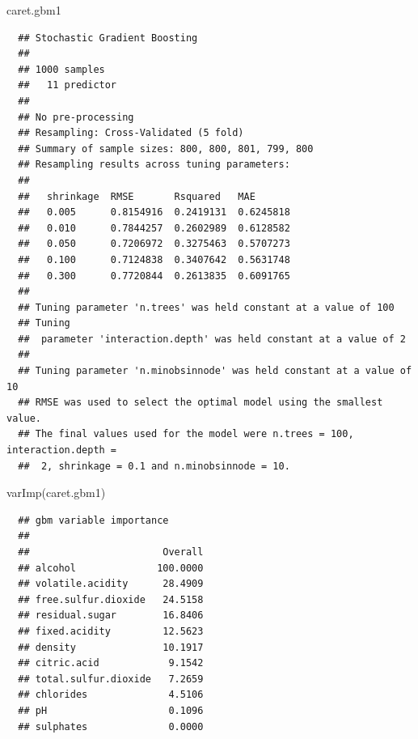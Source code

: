 \documentclass[
]{book}
\newenvironment{Shaded}{\begin{snugshade}}{\end{snugshade}}
\newcommand{\AttributeTok}[1]{\textcolor[rgb]{0.77,0.63,0.00}{#1}}
\newcommand{\FunctionTok}[1]{\textcolor[rgb]{0.00,0.00,0.00}{#1}}
\newcommand{\NormalTok}[1]{#1}
\newcommand{\SpecialCharTok}[1]{\textcolor[rgb]{0.00,0.00,0.00}{#1}}
\theoremstyle{break}
\theoremstyle{nonumberplain}
\begin{document}
\begin{Shaded}
\begin{Highlighting}[]
\NormalTok{caret.gbm1}
\end{Highlighting}
\end{Shaded}

\begin{verbatim}
  ## Stochastic Gradient Boosting 
  ## 
  ## 1000 samples
  ##   11 predictor
  ## 
  ## No pre-processing
  ## Resampling: Cross-Validated (5 fold) 
  ## Summary of sample sizes: 800, 800, 801, 799, 800 
  ## Resampling results across tuning parameters:
  ## 
  ##   shrinkage  RMSE       Rsquared   MAE      
  ##   0.005      0.8154916  0.2419131  0.6245818
  ##   0.010      0.7844257  0.2602989  0.6128582
  ##   0.050      0.7206972  0.3275463  0.5707273
  ##   0.100      0.7124838  0.3407642  0.5631748
  ##   0.300      0.7720844  0.2613835  0.6091765
  ## 
  ## Tuning parameter 'n.trees' was held constant at a value of 100
  ## Tuning
  ##  parameter 'interaction.depth' was held constant at a value of 2
  ## 
  ## Tuning parameter 'n.minobsinnode' was held constant at a value of 10
  ## RMSE was used to select the optimal model using the smallest value.
  ## The final values used for the model were n.trees = 100, interaction.depth =
  ##  2, shrinkage = 0.1 and n.minobsinnode = 10.
\end{verbatim}

\begin{Shaded}
\begin{Highlighting}[]
\FunctionTok{varImp}\NormalTok{(caret.gbm1)}
\end{Highlighting}
\end{Shaded}

\begin{verbatim}
  ## gbm variable importance
  ## 
  ##                       Overall
  ## alcohol              100.0000
  ## volatile.acidity      28.4909
  ## free.sulfur.dioxide   24.5158
  ## residual.sugar        16.8406
  ## fixed.acidity         12.5623
  ## density               10.1917
  ## citric.acid            9.1542
  ## total.sulfur.dioxide   7.2659
  ## chlorides              4.5106
  ## pH                     0.1096
  ## sulphates              0.0000
\end{verbatim}

\begin{Shaded}
\end{Shaded}
\end{document}
